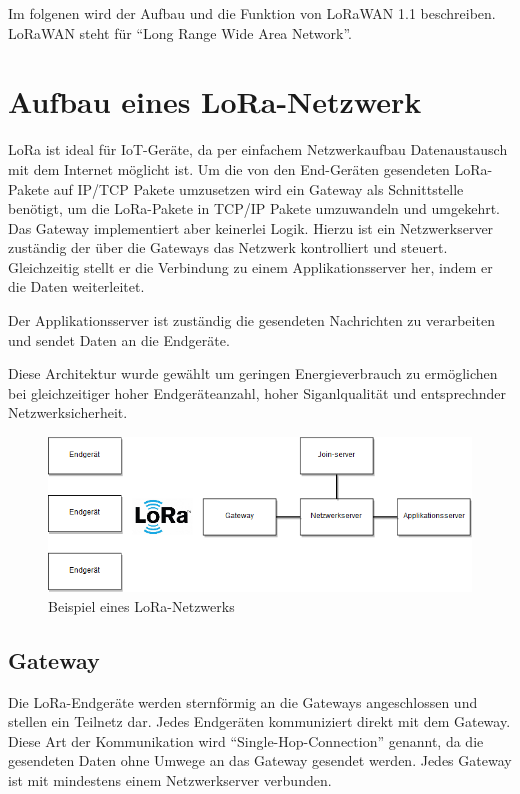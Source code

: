 \documentclass[a4paper, 12pt]{article}
\begin{document}
        Im folgenen wird der Aufbau und die Funktion von LoRaWAN 1.1 beschreiben.\newline
        LoRaWAN steht für ``Long Range Wide Area Network''. \cite{WhatIsLoRa}

        
        
    \section{Aufbau eines LoRa-Netzwerk}
        LoRa ist ideal für IoT-Geräte, da per einfachem Netzwerkaufbau Datenaustausch mit dem Internet möglicht ist.
        Um die von den End-Geräten gesendeten LoRa-Pakete auf IP/TCP Pakete umzusetzen wird ein Gateway als Schnittstelle
        benötigt, um die LoRa-Pakete in TCP/IP Pakete umzuwandeln und umgekehrt.
        Das Gateway implementiert aber keinerlei Logik. Hierzu ist ein Netzwerkserver zuständig der über die 
        Gateways das Netzwerk kontrolliert und steuert. Gleichzeitig stellt er die Verbindung zu einem 
        Applikationsserver her, indem er die Daten weiterleitet.

        Der Applikationsserver ist zuständig die gesendeten Nachrichten zu verarbeiten und sendet Daten an die 
        Endgeräte.

        Diese Architektur wurde gewählt um geringen Energieverbrauch zu ermöglichen bei gleichzeitiger 
        hoher Endgeräteanzahl, hoher Siganlqualität und entsprechnder Netzwerksicherheit. \cite[S. 8 ff.]{WhatIsLoRa}
        
        \begin{figure}[ht]
            \centering
            \includegraphics[width=\textwidth]{Netzwerkaufbau}
            \caption{Beispiel eines LoRa-Netzwerks}
        \end{figure}

        
        \subsection{Gateway}
            Die LoRa-Endgeräte werden sternförmig an die Gateways angeschlossen und stellen ein Teilnetz dar. 
            Jedes Endgeräten kommuniziert direkt mit dem Gateway. Diese Art der Kommunikation wird  
            ``Single-Hop-Connection'' genannt, da die gesendeten Daten ohne Umwege an das Gateway gesendet werden. 
            Jedes Gateway ist mit mindestens einem Netzwerkserver verbunden.
        
\end{document}

